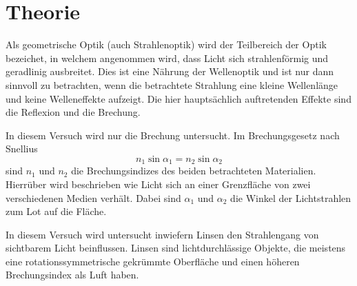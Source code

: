 \section{Theorie}
\label{sec:Theorie}

Als geometrische Optik (auch Strahlenoptik) wird der Teilbereich der Optik bezeichet, in welchem angenommen wird, dass Licht sich strahlenförmig und geradlinig ausbreitet.
Dies ist eine Nährung der Wellenoptik und ist nur dann sinnvoll zu betrachten, wenn die betrachtete Strahlung eine kleine Wellenlänge und keine Welleneffekte aufzeigt.
Die hier hauptsächlich auftretenden Effekte sind die Reflexion und die Brechung.

In diesem Versuch wird nur die Brechung untersucht.
Im Brechungsgesetz nach Snellius
\begin{equation}
    n_1 \sin \alpha_1 = n_2 \sin \alpha_2
    \label{eq:brechungsgesetz}
\end{equation}
sind $n_1$ und $n_2$ die Brechungsindizes des beiden betrachteten Materialien.
Hierrüber wird beschrieben wie Licht sich an einer Grenzfläche von zwei verschiedenen Medien verhält.
Dabei sind $\alpha_1$ und $\alpha_2$ die Winkel der Lichtstrahlen zum Lot auf die Fläche.

In diesem Versuch wird untersucht inwiefern Linsen den Strahlengang von sichtbarem Licht beinflussen.
Linsen sind lichtdurchlässige Objekte, die meistens eine rotationssymmetrische gekrümmte Oberfläche und einen höheren Brechungsindex als Luft haben.

